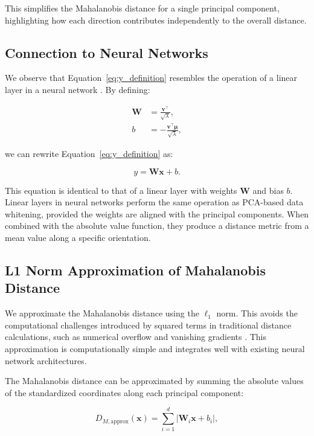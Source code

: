 This simplifies the Mahalanobis distance for a single principal component, highlighting how each direction contributes independently to the overall distance.

\subsection{Connection to Neural Networks}

We observe that Equation~\eqref{eq:y_definition} resembles the operation of a linear layer in a neural network \citep{goodfellow2016deep}. By defining:

\begin{align}
\label{eq:w_and_b_definitions}
\mathbf{W} &= \frac{ \mathbf{v}^\top }{ \sqrt{\lambda} }, \\
b &= - \frac{ \mathbf{v}^\top \boldsymbol{\mu} }{ \sqrt{\lambda} },
\end{align}

we can rewrite Equation~\eqref{eq:y_definition} as:

\begin{equation}
\label{eq:neural_network_equation}
y = \mathbf{W} \mathbf{x} + b.
\end{equation}

This equation is identical to that of a linear layer with weights $\mathbf{W}$ and bias $b$. Linear layers in neural networks perform the same operation as PCA-based data whitening, provided the weights are aligned with the principal components. When combined with the absolute value function, they produce a distance metric from a mean value along a specific orientation.

\subsection{L1 Norm Approximation of Mahalanobis Distance}

We approximate the Mahalanobis distance using the $\ell_1$ norm. This avoids the computational challenges introduced by squared terms in traditional distance calculations, such as numerical overflow and vanishing gradients \citep{lecun2012efficient}. This approximation is computationally simple and integrates well with existing neural network architectures.

The Mahalanobis distance can be approximated by summing the absolute values of the standardized coordinates along each principal component:

\begin{equation}
\label{eq:l1_approximation}
D_{M, \text{approx}}(\mathbf{x}) = \sum_{i=1}^d |\mathbf{W}_i \mathbf{x} + b_i|,
\end{equation}

